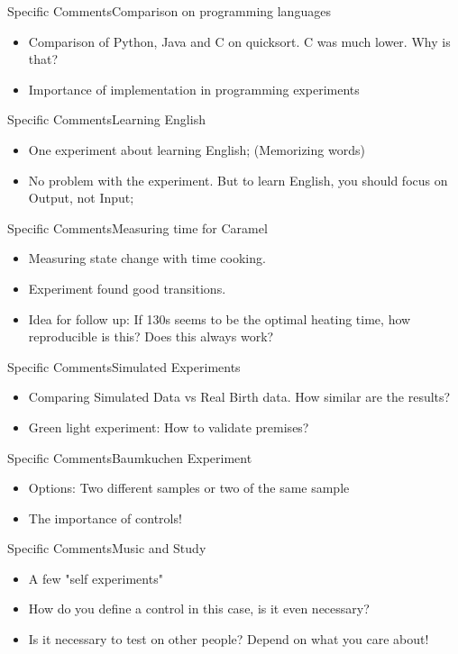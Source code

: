 \documentclass[aspectratio=169]{beamer}
\begin{document}
\begin{frame}{Specific Comments}{Comparison on programming languages}
  \begin{itemize}
    \item Comparison of Python, Java and C on quicksort. C was much lower. Why is that?
    \item Importance of implementation in programming experiments
  \end{itemize}
\end{frame}

\begin{frame}{Specific Comments}{Learning English}
  \begin{itemize}
    \item One experiment about learning English; (Memorizing words)
    \item No problem with the experiment. But to learn English, you should focus on Output, not Input;
  \end{itemize}
\end{frame}

\begin{frame}{Specific Comments}{Measuring time for Caramel}
  \begin{itemize}
    \item Measuring state change with time cooking.
    \item Experiment found good transitions.
    \item Idea for follow up: If 130s seems to be the optimal heating time, how reproducible is this? Does this always work?
  \end{itemize}
\end{frame}

\begin{frame}{Specific Comments}{Simulated Experiments}
  \begin{itemize}
    \item Comparing Simulated Data vs Real Birth data. How similar are the results?
    \item Green light experiment: How to validate premises?
  \end{itemize}
\end{frame}

\begin{frame}{Specific Comments}{Baumkuchen Experiment}
  \begin{itemize}
    \item Options: Two different samples or two of the same sample
    \item The importance of controls!
  \end{itemize}
\end{frame}

\begin{frame}{Specific Comments}{Music and Study}
  \begin{itemize}
    \item A few "self experiments"
    \item How do you define a control in this case, is it even necessary?
    \item Is it necessary to test on other people? Depend on what you care about!
  \end{itemize}
\end{frame}
\end{document}
